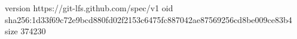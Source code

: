 version https://git-lfs.github.com/spec/v1
oid sha256:1d33f69c72e9bcd880fd02f2153c6475fc887042ae87569256cd8be009ce83b4
size 374230
